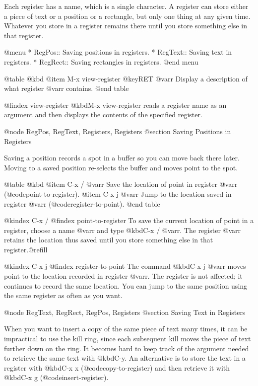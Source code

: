 {{{{  Each register has a name, which is a single character.  A register can
store either a piece of text or a position or a rectangle, but only one
thing at any given time.  Whatever you store in a register remains
there until you store something else in that register.

@menu
* RegPos::    Saving positions in registers.
* RegText::   Saving text in registers.
* RegRect::   Saving rectangles in registers.
@end menu

@table @kbd
@item M-x view-register @key{RET} @var{r}
Display a description of what register @var{r} contains.
@end table

@findex view-register
  @kbd{M-x view-register} reads a register name as an argument and then
displays the contents of the specified register.

@node RegPos, RegText, Registers, Registers
@section Saving Positions in Registers

  Saving a position records a spot in a buffer so you can move
back there later.  Moving to a saved position re-selects the buffer
and moves point to the spot.

@table @kbd
@item C-x / @var{r}
Save the location of point in register @var{r} (@code{point-to-register}).
@item C-x j @var{r}
Jump to the location saved in register @var{r} (@code{register-to-point}).
@end table

@kindex C-x /
@findex point-to-register
  To save the current location of point in a register, choose a name
@var{r} and type @kbd{C-x / @var{r}}.  The register @var{r} retains
the location thus saved until you store something else in that
register.@refill

@kindex C-x j
@findex register-to-point
  The command @kbd{C-x j @var{r}} moves point to the location recorded
in register @var{r}.  The register is not affected; it continues to
record the same location.  You can jump to the same position using the
same register as often as you want.

@node RegText, RegRect, RegPos, Registers
@section Saving Text in Registers

  When you want to insert a copy of the same piece of text many times, it
can be impractical to use the kill ring, since each subsequent kill moves
the piece of text further down on the ring.  It becomes hard to keep
track of the argument needed to retrieve the same text with @kbd{C-y}.  An
alternative is to store the text in a register with @kbd{C-x x}
(@code{copy-to-register}) and then retrieve it with @kbd{C-x g}
(@code{insert-register}).

}}}}
